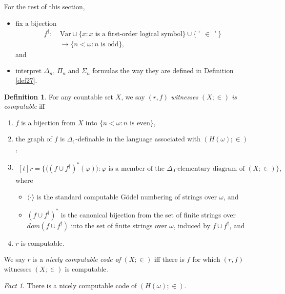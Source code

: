 \documentclass[12pt, twoside]{memoir}
\numberwithin{equation}{section}
\theoremstyle{definition}
\newtheorem{defi}[thm]{Definition}
\theoremstyle{remark}
\newtheorem{fact}[thm]{Fact}
\theoremstyle{definition}
\theoremstyle{definition}
\theoremstyle{definition}
\theoremstyle{remark}
\begin{document}
For the rest of this section,
\begin{itemize}
    \item fix a bijection 
    \begin{align*}
        f^{\dagger} : \ & \mathrm{Var} \cup \{x : x \text{ is a first-order logical symbol}\} \cup \{\ulcorner \in \urcorner\} \\
        & \longrightarrow \{n < \omega : n \text{ is odd}\} \text{,}
    \end{align*}
    and
    \item interpret $\Delta_n$, $\Pi_n$ and $\Sigma_n$ formulas the way they are defined in Definition \ref{def27}.
\end{itemize}

\begin{defi}
For any countable set $X$, we say $(r, f)$ \emph{witnesses} $(X; \in)$ \emph{is computable} iff
\begin{enumerate}[label=(\alph*)] 
    \item $f$ is a bijection from $X$ into $\{n < \omega : n \text{ is even}\}$,
    \item the graph of $f$ is $\Delta_1$-definable in the language associated with $(H(\omega); \in)$,
    \item
    \!
    $\begin{aligned}[t]
        r = \{\langle (f \cup f^{\dagger})^*(\varphi) \rangle : \varphi \text{ is a member of the } \Delta_0 \text{-elementary diagram of } (X; \in)\}, 
    \end{aligned}$
    \medskip
    \\
    where 
    \begin{itemize}
        \item $\langle \cdot \rangle$ is the standard computable G\"odel numbering of strings over $\omega$, and
        \item $(f \cup f^{\dagger})^*$ is the canonical bijection from the set of finite strings over $dom(f \cup f^{\dagger})$ into the set of finite strings over $\omega$, induced by $f \cup f^{\dagger}$, and
    \end{itemize}
    \item $r$ is computable.
\end{enumerate}
We say $r$ is a \emph{nicely computable code of} $(X; \in)$ iff there is $f$ for which $(r, f)$ witnesses $(X; \in)$ is computable.
\end{defi}

\begin{fact}
There is a nicely computable code of $(H(\omega); \in)$. 
\end{fact}
\end{document}
